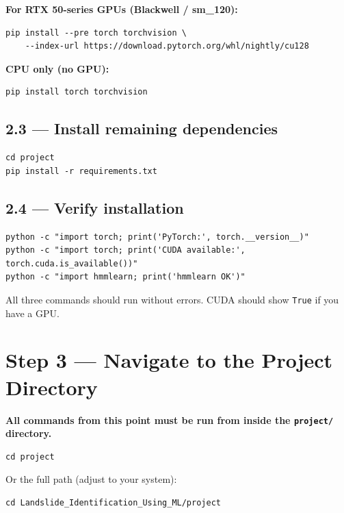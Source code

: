 \documentclass[11pt]{article}
\begin{document}
\textbf{For RTX 50-series GPUs (Blackwell / sm\_120):}
\begin{verbatim}
pip install --pre torch torchvision \
    --index-url https://download.pytorch.org/whl/nightly/cu128
\end{verbatim}

\textbf{CPU only (no GPU):}
\begin{verbatim}
pip install torch torchvision
\end{verbatim}

\subsection{2.3 --- Install remaining dependencies}

\begin{verbatim}
cd project
pip install -r requirements.txt
\end{verbatim}

\subsection{2.4 --- Verify installation}

\begin{verbatim}
python -c "import torch; print('PyTorch:', torch.__version__)"
python -c "import torch; print('CUDA available:', torch.cuda.is_available())"
python -c "import hmmlearn; print('hmmlearn OK')"
\end{verbatim}

All three commands should run without errors. CUDA should show \texttt{True} if you have a GPU.

\section{Step 3 --- Navigate to the Project Directory}

\textbf{All commands from this point must be run from inside the \texttt{project/} directory.}

\begin{verbatim}
cd project
\end{verbatim}

Or the full path (adjust to your system):
\begin{verbatim}
cd Landslide_Identification_Using_ML/project
\end{verbatim}
\end{document}
